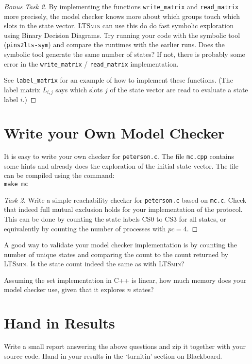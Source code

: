 \documentclass[12pt]{article}
\def\ltsmin{\textsc{LTSmin}\xspace}
\begin{document}
\begin{proof}[Bonus Task 2]
By implementing the functions 
\texttt{write\_matrix} and \texttt{read\_matrix} more precisely,
the model checker knows more about which groups touch which slots in the
state vector.
\ltsmin can use this do do fast symbolic exploration using
Binary Decision Diagrams. Try running your code with
the symbolic tool (\texttt{pins2lts-sym}) and compare the
runtimes with the earlier runs.
Does the symbolic tool generate the same number of states?
If not, there is probably some error in the
\texttt{write\_matrix} / \texttt{read\_matrix} implementation.

See \texttt{label\_matrix} for an example of how to implement these
functions. (The label matrix $L_{i,j}$
says which slots $j$ of the state vector are
read to evaluate a state label $i$.)
\end{proof}



\section{Write your Own Model Checker}

It is easy to write your own checker for \texttt{peterson.c}.
The file \texttt{mc.cpp} contains some hints and already does 
the exploration of the initial state vector. The file can be compiled
using the command:\\
\texttt{make mc}

\begin{proof}[Task 2]
Write a simple reachability checker for \texttt{peterson.c}
based on \texttt{mc.c}.
Check that indeed full mutual exclusion holds for your
implementation of the protocol. This can be done by
counting the state labels CS0 to CS3 for all states,
or equivalently by counting the number of processes
with $pc = 4$.
\end{proof}


A good way to validate your model checker implementation is by
counting the number of unique states and comparing the
count to the count returned by \ltsmin.
Is the state count indeed the same as with \ltsmin?

Assuming the set implementation in C++ is linear, how much
memory does your model checker use, given that it explores
$n$ states?


\section{Hand in Results}

Write a small report answering the above questions and zip it together with
your source code.
Hand in your results in the `turnitin' section on Blackboard.


%
%
%
\end{document}
